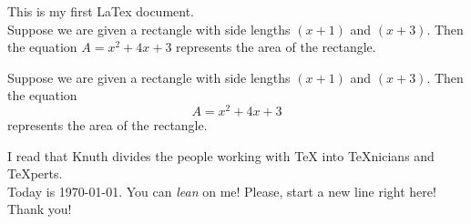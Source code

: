 \documentclass[12pt]{article}
\begin{document}
This is my first LaTex document.\\

Suppose we are given a rectangle with side lengths $(x+1)$ and $(x+3)$. Then the equation $A=x^2+4x+3$ represents the area of the rectangle.

Suppose we are given a rectangle with side lengths $(x+1)$ and $(x+3)$. Then the equation $$A=x^2+4x+3$$ represents the area of the rectangle.

I read that Knuth divides the people working with \TeX{} into \TeX{}nicians and \TeX perts. \\ Today is \today.
You can \textsl{lean} on me! Please, start a new line right here!\newline
Thank you!
\end{document}
